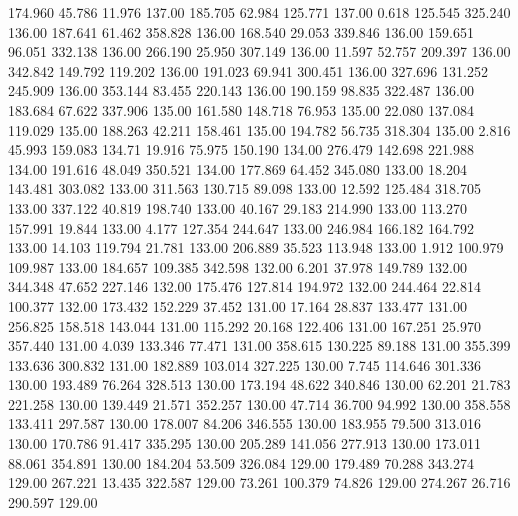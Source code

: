  174.960   45.786   11.976       137.00
 185.705   62.984  125.771       137.00
   0.618  125.545  325.240       136.00
 187.641   61.462  358.828       136.00
 168.540   29.053  339.846       136.00
 159.651   96.051  332.138       136.00
 266.190   25.950  307.149       136.00
  11.597   52.757  209.397       136.00
 342.842  149.792  119.202       136.00
 191.023   69.941  300.451       136.00
 327.696  131.252  245.909       136.00
 353.144   83.455  220.143       136.00
 190.159   98.835  322.487       136.00
 183.684   67.622  337.906       135.00
 161.580  148.718   76.953       135.00
  22.080  137.084  119.029       135.00
 188.263   42.211  158.461       135.00
 194.782   56.735  318.304       135.00
   2.816   45.993  159.083       134.71
  19.916   75.975  150.190       134.00
 276.479  142.698  221.988       134.00
 191.616   48.049  350.521       134.00
 177.869   64.452  345.080       133.00
  18.204  143.481  303.082       133.00
 311.563  130.715   89.098       133.00
  12.592  125.484  318.705       133.00
 337.122   40.819  198.740       133.00
  40.167   29.183  214.990       133.00
 113.270  157.991   19.844       133.00
   4.177  127.354  244.647       133.00
 246.984  166.182  164.792       133.00
  14.103  119.794   21.781       133.00
 206.889   35.523  113.948       133.00
   1.912  100.979  109.987       133.00
 184.657  109.385  342.598       132.00
   6.201   37.978  149.789       132.00
 344.348   47.652  227.146       132.00
 175.476  127.814  194.972       132.00
 244.464   22.814  100.377       132.00
 173.432  152.229   37.452       131.00
  17.164   28.837  133.477       131.00
 256.825  158.518  143.044       131.00
 115.292   20.168  122.406       131.00
 167.251   25.970  357.440       131.00
   4.039  133.346   77.471       131.00
 358.615  130.225   89.188       131.00
 355.399  133.636  300.832       131.00
 182.889  103.014  327.225       130.00
   7.745  114.646  301.336       130.00
 193.489   76.264  328.513       130.00
 173.194   48.622  340.846       130.00
  62.201   21.783  221.258       130.00
 139.449   21.571  352.257       130.00
  47.714   36.700   94.992       130.00
 358.558  133.411  297.587       130.00
 178.007   84.206  346.555       130.00
 183.955   79.500  313.016       130.00
 170.786   91.417  335.295       130.00
 205.289  141.056  277.913       130.00
 173.011   88.061  354.891       130.00
 184.204   53.509  326.084       129.00
 179.489   70.288  343.274       129.00
 267.221   13.435  322.587       129.00
  73.261  100.379   74.826       129.00
 274.267   26.716  290.597       129.00
